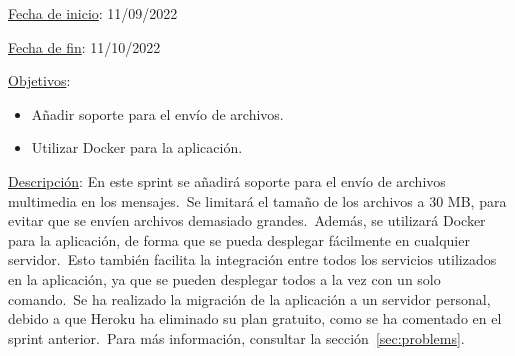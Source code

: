 
\underline{Fecha de inicio}: 11/09/2022

\underline{Fecha de fin}: 11/10/2022

\underline{Objetivos}:
\begin{itemize}
	\item Añadir soporte para el envío de archivos.
	\item Utilizar Docker para la aplicación.
\end{itemize}

\underline{Descripción}:
En este sprint se añadirá soporte para el envío de archivos multimedia en los mensajes.\ Se limitará el tamaño de
los archivos a 30 MB, para evitar que se envíen archivos demasiado grandes.\ Además, se utilizará Docker para
la aplicación, de forma que se pueda desplegar fácilmente en cualquier servidor.\ Esto también facilita la integración
entre todos los servicios utilizados en la aplicación, ya que se pueden desplegar todos a la vez con un solo
comando.\ Se ha realizado la migración de la aplicación a un servidor personal, debido a que Heroku ha eliminado
su plan gratuito, como se ha comentado en el sprint anterior.\ Para más información, consultar la
sección~\ref{sec:problems}.


